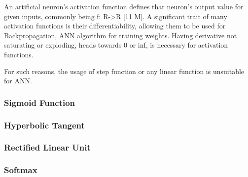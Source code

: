An artificial neuron's activation function defines that neuron's output value for given inputs, commonly being f: R->R [11 M]. A significant trait of many activation functions is their differentiability, allowing them to be used for Backpropagation, ANN algorithm for training weights. Having derivative not saturating or exploding, heads towards 0 or inf, is necessary for activation functions.

For such reasons, the usage of step function or any linear function is unsuitable for ANN.

\subsubsection{Sigmoid Function}

\subsubsection{Hyperbolic Tangent}

\subsubsection{Rectified Linear Unit}

\subsubsection{Softmax}

